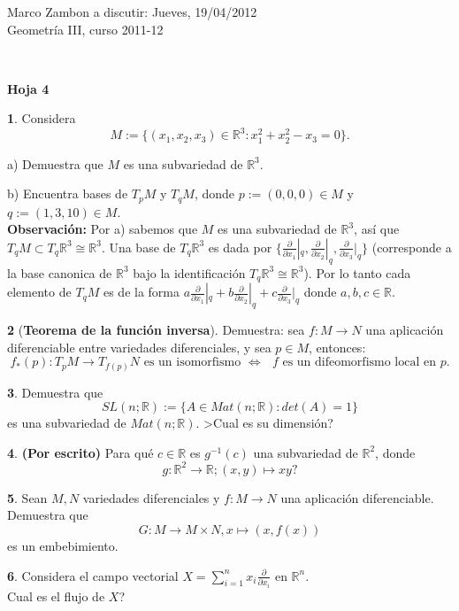 \documentclass[12pt,a4paper]{report}
\theoremstyle{definition}
\newtheorem{ex}{}
\newcommand{\pd}[1]{\frac{\partial}{\partial #1}} %
\newcommand{\RR}{\ensuremath{\mathbb R}}
\begin{document}
\noindent
{\sffamily\large Marco Zambon 
\hfill   a discutir:   Jueves, 19/04/2012\\Geometr\'ia III, curso 2011-12}
 

\noindent
\hrulefill{}\\
\begin{center}\bfseries\large\textsf{Hoja 4    \vspace{-2mm}}
\end{center}

\noindent
 
 

\begin{ex}
Considera $$M:=\{(x_1,x_2,x_3)\in \RR^3: x_1^2+x_2^2-x_3=0\}.$$

a) Demuestra que $M$ es una subvariedad de $\RR^3$.

b) Encuentra bases de $T_pM$ y $T_qM$,
donde $p:=(0,0,0)\in M$ y $q:=(1,3,10)\in M$.\\
\textbf{Observaci\'on:} Por a) sabemos que $M$  es una subvariedad de  $\RR^3$, as\'i que  $T_qM\subset T_q\RR^3\cong \RR^3$. Una base de $T_q\RR^3$ es dada por $\{\pd{x_1}|_q,\pd{x_2}|_q,\pd{x_3}|_q\}$ (corresponde a la base  canonica de  $\RR^3$ bajo la identificaci\'on $T_q\RR^3\cong \RR^3$). Por lo tanto 
 cada elemento de $T_qM$ es de la forma $a\pd{x_1}|_q+b\pd{x_2}|_q+c\pd{x_3}|_q$ donde $a,b,c\in \RR$. 
\end{ex}


 
\begin{ex} [\textbf{Teorema de la funci\'on inversa}] Demuestra:
sea $f \colon M \to N$ una aplicaci\'on diferenciable entre variedades diferenciales, y sea $p\in M$, entonces:
$$\text{$f_*(p) \colon T_pM \to T_{f(p)}N$ es un isomorfismo $\Leftrightarrow$ $f$ es un difeomorfismo local en $p$}.$$
\end{ex} 






\begin{ex} 
Demuestra que
$$SL(n;\RR) := \{A \in Mat(n;\RR) : det(A) = 1\}$$
es una subvariedad de $Mat(n;\RR)$. >Cual es su dimensi\'on? 
\end{ex} 


\begin{ex} {\bf (Por escrito)} Para qu\'e
 $ c\in \RR$ es $g^{-1}(c)$ una subvariedad de $\RR^2$, donde $$g : \RR^2 \to \RR; (x, y) \mapsto xy?$$  
\end{ex} 

\begin{ex} Sean $M,N$  variedades diferenciales y $f \colon M \to N$ una aplicaci\'on
diferenciable. Demuestra que $$G\colon M \to M \times N, x\mapsto (x,f(x))$$
es un embebimiento.  
\end{ex} 

\begin{ex} 
Considera el campo vectorial $X=\sum_{i=1}^n x_i \frac{\partial}{\partial x_i}$ en $\RR^n$.\\
Cual es el flujo de $X$?  
\end{ex} 


 
\end{document}
